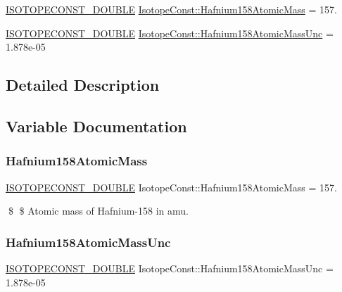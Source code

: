 \begin{DoxyCompactItemize}
\item 
\mbox{\hyperlink{group___isotope_const-_macros_ga8f45a7272ce02c0b4c65c44636ed719a}{I\+S\+O\+T\+O\+P\+E\+C\+O\+N\+S\+T\+\_\+\+D\+O\+U\+B\+LE}} \mbox{\hyperlink{group___isotope_const-_hafnium-_hf158_gaec6b12435017aba0fd8a8d37cda2df07}{Isotope\+Const\+::\+Hafnium158\+Atomic\+Mass}} = 157.
\item 
\mbox{\hyperlink{group___isotope_const-_macros_ga8f45a7272ce02c0b4c65c44636ed719a}{I\+S\+O\+T\+O\+P\+E\+C\+O\+N\+S\+T\+\_\+\+D\+O\+U\+B\+LE}} \mbox{\hyperlink{group___isotope_const-_hafnium-_hf158_ga1a8136944c78a41e3afeae00b2033c61}{Isotope\+Const\+::\+Hafnium158\+Atomic\+Mass\+Unc}} = 1.\+878e-\/05
\end{DoxyCompactItemize}


\subsection{Detailed Description}


\subsection{Variable Documentation}
\mbox{\label{group___isotope_const-_hafnium-_hf158_gaec6b12435017aba0fd8a8d37cda2df07}} 
\subsubsection{\texorpdfstring{Hafnium158\+Atomic\+Mass}{Hafnium158AtomicMass}}
{\footnotesize\ttfamily \mbox{\hyperlink{group___isotope_const-_macros_ga8f45a7272ce02c0b4c65c44636ed719a}{I\+S\+O\+T\+O\+P\+E\+C\+O\+N\+S\+T\+\_\+\+D\+O\+U\+B\+LE}} Isotope\+Const\+::\+Hafnium158\+Atomic\+Mass = 157.}

\$ \$ Atomic mass of Hafnium-\/158 in amu. \mbox{\label{group___isotope_const-_hafnium-_hf158_ga1a8136944c78a41e3afeae00b2033c61}} 
\subsubsection{\texorpdfstring{Hafnium158\+Atomic\+Mass\+Unc}{Hafnium158AtomicMassUnc}}
{\footnotesize\ttfamily \mbox{\hyperlink{group___isotope_const-_macros_ga8f45a7272ce02c0b4c65c44636ed719a}{I\+S\+O\+T\+O\+P\+E\+C\+O\+N\+S\+T\+\_\+\+D\+O\+U\+B\+LE}} Isotope\+Const\+::\+Hafnium158\+Atomic\+Mass\+Unc = 1.\+878e-\/05}

